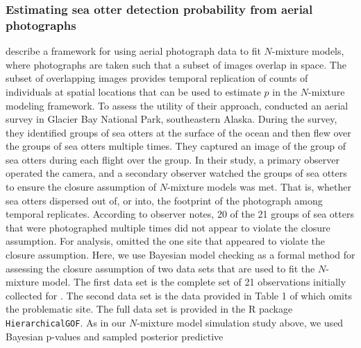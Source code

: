 \documentclass[12pt,english]{article}
\begin{document}
\begin{spacing}{1.9}


\subsubsection*{Estimating sea otter detection probability from aerial
  photographs}

\cite{williams2017estimating} describe a framework for using aerial
photograph data to fit $N$-mixture models, where photographs are taken
such that a subset of images overlap in space. The subset of
overlapping images provides temporal replication of counts of
individuals at spatial locations that can be used to estimate $p$ in
the $N$-mixture modeling framework. To assess the utility of their
approach, \cite{williams2017estimating} conducted an aerial survey in
Glacier Bay National Park, southeastern Alaska. During the survey, they
identified groups of sea otters at the surface of the ocean and then flew over
the groups of sea otters multiple times. They captured an image of the
group of sea otters during each flight over the group. In their study, a
primary observer operated the camera, and a secondary observer watched
the groups of sea otters to ensure the closure assumption of
$N$-mixture models was met. That is, whether sea otters dispersed out
of, or into, the footprint of the photograph among temporal
replicates. According to observer notes, 20 of the 21 groups of sea
otters that were photographed multiple times did not appear to violate
the closure assumption. For analysis, \citet{williams2017estimating}
omitted the one site that appeared to violate the closure
assumption. Here, we use Bayesian model checking as a formal method
for assessing the closure assumption of two data sets that are used to
fit the $N$-mixture model. The first data set is the complete set of
21 observations initially collected for
\citet{williams2017estimating}. The second data set is the data
provided in Table 1 of \citet{williams2017estimating} which omits the
problematic site. The full data set is provided in the R package
\texttt{HierarchicalGOF}. As in our $N$-mixture model simulation study
above, we used Bayesian p-values and sampled posterior predictive

\end{spacing}
\end{document}
